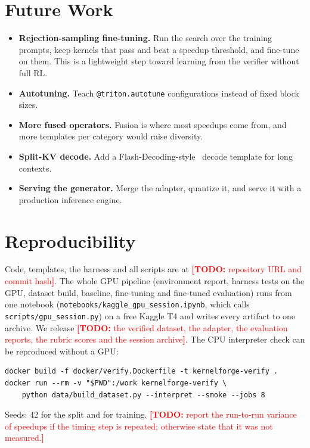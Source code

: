 \documentclass[11pt]{article}
\newcommand{\todo}[1]{\textcolor{red}{\textbf{[TODO:} #1\textbf{]}}}
\newcommand{\code}[1]{\texttt{#1}}
\begin{document}
\section{Future Work}
\begin{itemize}
  \item \textbf{Rejection-sampling fine-tuning.} Run the search over the training prompts, keep
        kernels that pass and beat a speedup threshold, and fine-tune on them. This is a lightweight
        step toward learning from the verifier without full RL.
  \item \textbf{Autotuning.} Teach \code{@triton.autotune} configurations instead of fixed block sizes.
  \item \textbf{More fused operators.} Fusion is where most speedups come from, and more templates
        per category would raise diversity.
  \item \textbf{Split-KV decode.} Add a Flash-Decoding-style~\cite{dao2023flashdecoding} decode template
        for long contexts.
  \item \textbf{Serving the generator.} Merge the adapter, quantize it, and serve it with a production
        inference engine.
\end{itemize}

\section{Reproducibility}
Code, templates, the harness and all scripts are at \todo{repository URL and commit hash}.
The whole GPU pipeline (environment report, harness tests on the GPU, dataset build, baseline,
fine-tuning and fine-tuned evaluation) runs from one notebook
(\code{notebooks/kaggle\_gpu\_session.ipynb}, which calls \code{scripts/gpu\_session.py}) on a free
Kaggle T4 and writes every artifact to one archive. %
We release \todo{the verified dataset, the adapter, the evaluation reports, the rubric scores and
the session archive}. The CPU interpreter check can be reproduced without a GPU:
\begin{verbatim}
docker build -f docker/verify.Dockerfile -t kernelforge-verify .
docker run --rm -v "$PWD":/work kernelforge-verify \
    python data/build_dataset.py --interpret --smoke --jobs 8
\end{verbatim}
Seeds: 42 for the split and for training. \todo{report the run-to-run variance of speedups if the
timing step is repeated; otherwise state that it was not measured.}



\end{document}
